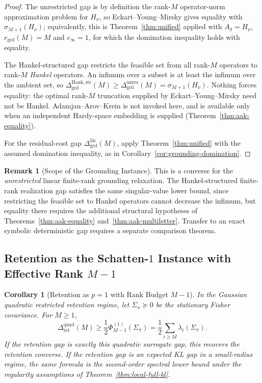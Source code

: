 \documentclass[12pt]{article}
\newtheorem{corollary}[theorem]{Corollary}
\theoremstyle{definition}
\newtheorem{remark}[theorem]{Remark}
\newcommand{\RetQuad}{\Delta_{\mathrm{ret}}^{\mathrm{quad}}}
\newcommand{\GrdLin}{\Delta_{\mathrm{grd}}^{\mathrm{lin}}}
\newcommand{\Dunres}{\Delta_{\mathrm{grd}}^{\mathrm{unres}}}
\newcommand{\DHankstr}{\Delta_{\mathrm{grd}}^{\mathrm{Hank,str}}}
\begin{document}
\begin{proof}
The unrestricted gap is by definition the rank-$M$ operator-norm approximation
problem for $H_\nu$, so Eckart--Young--Mirsky
\cite{eckart1936,mirsky1960} gives equality with $\sigma_{M+1}(H_\nu)$;
equivalently, this is Theorem~\ref{thm:unified} applied with $A_\delta=H_\nu$,
$r_{\mathrm{grd}}(M)=M$ and $c_\infty=1$, for which the domination inequality
holds with equality.

The Hankel-structured gap restricts the feasible set from all rank-$M$
operators to rank-$M$ \emph{Hankel} operators.  An infimum over a subset is at
least the infimum over the ambient set, so
$\DHankstr(M)\ge\Dunres(M)=\sigma_{M+1}(H_\nu)$.  Nothing forces equality: the
optimal rank-$M$ truncation supplied by Eckart--Young--Mirsky need not be
Hankel.  Adamjan--Arov--Krein is not invoked here, and is available only when
an independent Hardy-space embedding is supplied
(Theorem~\ref{thm:aak-equality}).

For the residual-cost gap $\GrdLin(M)$, apply Theorem~\ref{thm:unified} with
the assumed domination inequality, as in
Corollary~\ref{cor:grounding-domination}.
\end{proof}

\begin{remark}[Scope of the Grounding Instance]
\label{rem:grd-schatten-scope}
This is a converse for the \emph{unrestricted} linear finite-rank grounding
relaxation.  The Hankel-structured finite-rank realization gap satisfies the
same singular-value lower bound, since restricting the feasible set to Hankel
operators cannot decrease the infimum, but equality there requires the
additional structural hypotheses of Theorems~\ref{thm:aak-equality}
and~\ref{thm:aak-multiletter}.  Transfer to an exact symbolic deterministic gap
requires a separate comparison theorem.
\end{remark}

\subsection{Retention as the Schatten-$1$ Instance with Effective Rank $M-1$}
\label{subsec:schatten-retention}

\begin{corollary}[Retention as $p=1$ with Rank Budget $M-1$]
\label{cor:ret-schatten}
In the Gaussian quadratic restricted retention regime, let
$\Sigma_\pi\succeq0$ be the stationary Fisher covariance.  For $M\ge1$,
\[
\RetQuad(M)
\ge
\frac12
\Phi^{(1)}_{M-1}(\Sigma_\pi)
=
\frac12
\sum_{i\ge M}
\lambda_i(\Sigma_\pi).
\]
If the retention gap is exactly this quadratic surrogate gap, this recovers
the retention converse.  If the retention gap is an expected KL gap in a
small-radius regime, the same formula is the second-order spectral lower bound
under the regularity assumptions of Theorem~\ref{thm:local-full-kl}.
\end{corollary}
\end{document}
